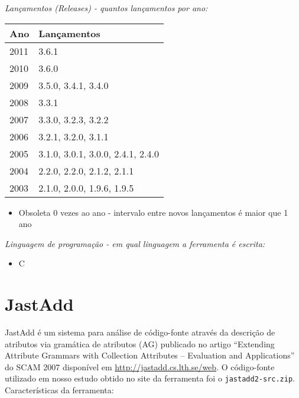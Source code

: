 \begin{description}

  \item {\it Lançamentos ({\it Releases}) - quantos lançamentos por ano:}
    \begin{table}[h!]
      \centering
      \begin{tabular}{| l | l |}
        \hline
        Ano  & Lançamentos                       \\
        \hline
        2011 & 3.6.1                             \\
        2010 & 3.6.0                             \\
        2009 & 3.5.0, 3.4.1, 3.4.0               \\
        2008 & 3.3.1                             \\
        2007 & 3.3.0, 3.2.3, 3.2.2               \\
        2006 & 3.2.1, 3.2.0, 3.1.1               \\
        2005 & 3.1.0, 3.0.1, 3.0.0, 2.4.1, 2.4.0 \\
        2004 & 2.2.0, 2.2.0, 2.1.2, 2.1.1        \\
        2003 & 2.1.0, 2.0.0, 1.9.6, 1.9.5        \\
        \hline
      \end{tabular}
    \end{table}
    \begin{itemize}
      \item Obsoleta $0$ vezes ao ano - intervalo entre novos lançamentos é maior que 1 ano
    \end{itemize}

  \item {\it Linguagem de programação - em qual linguagem a ferramenta é escrita:}
    \begin{itemize}
      \item C
    \end{itemize}

\end{description}

\section{JastAdd}

JastAdd é um sistema para análise de código-fonte através da descrição de
atributos via gramática de atributos (AG) publicado no artigo ``Extending
Attribute Grammars with Collection Attributes – Evaluation and Applications''
do SCAM 2007 disponível em \url{http://jastadd.cs.lth.se/web}. O código-fonte
utilizado em nosso estudo obtido no site da ferramenta foi o
\texttt{jastadd2-src.zip}. Características da ferramenta:

